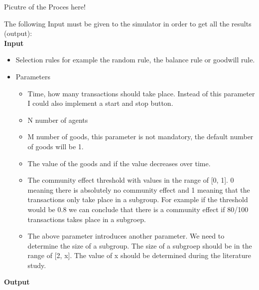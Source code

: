 \documentclass{article}
\begin{document}
Picutre of the Proces here!


The following Input must be given to the simulator in order to get all the results (output): 
\\
\textbf{Input}

\begin{itemize}
  \item Selection rules for example the random rule, the balance rule or goodwill rule.
  \item Parameters
	\begin{itemize}
 		 \item Time, how many transactions should take place. Instead of this parameter I could also implement a start and stop button.
  		\item N number of agents
  		\item M number of goods, this parameter is not mandatory, the default number of goods will be 1.
		\item The value of the goods and if the value decreases over time.
		\item The community effect threshold with values in the range of [0, 1]. 0 meaning there is absolutely no community effect and 1 meaning that the transactions only take place in a subgroup. For example if the threshold would be 0.8 we can conclude that there is a community effect if 80/100 transactions takes place in a subgroep.
		\item The above parameter introduces another parameter. We need to determine the size of a subgroup. The size of a subgroep should be in the range of [2, x]. The value of x should be determined during the literature study.
	\end{itemize} 
\end{itemize}

\textbf{Output}
\end{document}
